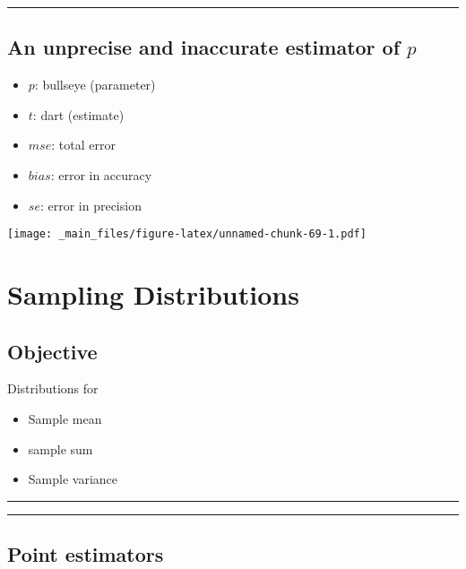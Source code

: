 \documentclass[
]{book}
\providecommand{\tightlist}{%
  \setlength{\itemsep}{0pt}\setlength{\parskip}{0pt}}
\begin{document}
\begin{center}\rule{0.5\linewidth}{0.5pt}\end{center}

\hypertarget{an-unprecise-and-inaccurate-estimator-of-p}{%
\section{\texorpdfstring{An unprecise and inaccurate estimator of \(p\)}{An unprecise and inaccurate estimator of p}}\label{an-unprecise-and-inaccurate-estimator-of-p}}

\begin{itemize}
\tightlist
\item
  \(p\): bullseye (parameter)
\item
  \(t\): dart (estimate)
\item
  \(mse\): total error
\item
  \(bias\): error in accuracy
\item
  \(se\): error in precision
\end{itemize}

\texttt{[image: \_main\_files/figure-latex/unnamed-chunk-69-1.pdf]}

\hypertarget{sampling-distributions}{%
\chapter{Sampling Distributions}\label{sampling-distributions}}

\hypertarget{objective-9}{%
\section{Objective}\label{objective-9}}

Distributions for

\begin{itemize}
\tightlist
\item
  Sample mean
\item
  sample sum
\item
  Sample variance
\end{itemize}

\begin{center}\rule{0.5\linewidth}{0.5pt}\end{center}

\begin{center}\rule{0.5\linewidth}{0.5pt}\end{center}

\hypertarget{point-estimators-4}{%
\section{Point estimators}\label{point-estimators-4}}
\end{document}
